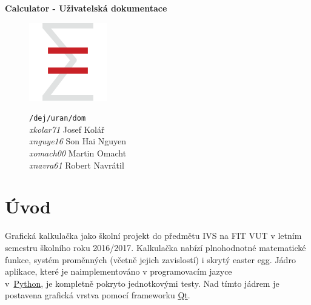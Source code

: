 \documentclass[a4paper, 11pt]{article}
\begin{document}
\thispagestyle{empty}

{\Huge{\textbf{Calculator - Uživatelská dokumentace}}}

\begin{figure}[H]
    \centering
    \vspace{20pt}
    \includegraphics[width=128px]{logo.png}
    \vspace{20pt}

    \texttt{/dej/uran/dom}\\
    \textit{xkolar71} Josef Kolář\\
    \textit{xnguye16} Son Hai Nguyen\\
    \textit{xomach00} Martin Omacht\\
    \textit{xnavra61} Robert Navrátil
\end{figure}

\hypersetup{
    colorlinks=true,
    linktoc=all
}

{\hypersetup{linkcolor=black}
\tableofcontents
}


\newpage

\pagestyle{fancy}

\section{Úvod}\label{uvod}

Grafická kalkulačka jako školní projekt do předmětu IVS na FIT VUT v letním semestru školního roku 2016/2017. Kalkulačka nabízí plnohodnotné matematické funkce, systém proměnných (včetně jejich zavislostí) i skrytý easter egg. Jádro aplikace, které je naimplementováno v programovacím jazyce \\v~\href{https://www.python.org/}{Python}, je kompletně pokryto jednotkovými testy. Nad tímto jádrem je postavena grafická vrstva pomocí frameworku \href{https://www.qt.io/}{Qt}.
\end{document}
